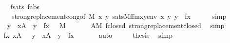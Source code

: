 \begin{isabellebody}
\ \ \ \ \isamarkupfalse%
\ fsats\ fabs\ \isanewline
\ \ \ \ \ \ strong{\isacharunderscore}{\kern0pt}replacement{\isacharunderscore}{\kern0pt}cong{\isacharbrackleft}{\kern0pt}of\ {\isachardoublequoteopen}{\isacharhash}{\kern0pt}{\isacharhash}{\kern0pt}M{\isachardoublequoteclose}\ {\isachardoublequoteopen}{\isasymlambda}x\ y{\isachardot}{\kern0pt}\ sats{\isacharparenleft}{\kern0pt}M{\isacharcomma}{\kern0pt}f{\isacharunderscore}{\kern0pt}fm{\isacharcomma}{\kern0pt}{\isacharbrackleft}{\kern0pt}x{\isacharcomma}{\kern0pt}y{\isacharbrackright}{\kern0pt}{\isacharat}{\kern0pt}env{\isacharparenright}{\kern0pt}{\isachardoublequoteclose}\ {\isachardoublequoteopen}{\isasymlambda}x\ y{\isachardot}{\kern0pt}\ y\ {\isacharequal}{\kern0pt}\ f{\isacharparenleft}{\kern0pt}x{\isacharparenright}{\kern0pt}{\isachardoublequoteclose}{\isacharbrackright}{\kern0pt}\isanewline
\ \ \ \ \isamarkupfalse%
\ simp\isanewline
\ \ \isamarkupfalse%
\isanewline
\ \ \isamarkupfalse%
\ {\isachardoublequoteopen}{\isacharbraceleft}{\kern0pt}\ y\ {\isachardot}{\kern0pt}\ x{\isasymin}A\ {\isacharcomma}{\kern0pt}\ y\ {\isacharequal}{\kern0pt}\ f{\isacharparenleft}{\kern0pt}x{\isacharparenright}{\kern0pt}\ {\isacharbraceright}{\kern0pt}\ {\isasymin}\ M{\isachardoublequoteclose}\ \isanewline
\ \ \ \ \isamarkupfalse%
\ {\isacartoucheopen}A{\isasymin}M{\isacartoucheclose}\ fclosed\ strong{\isacharunderscore}{\kern0pt}replacement{\isacharunderscore}{\kern0pt}closed\ \isamarkupfalse%
\ simp\isanewline
\ \ \isamarkupfalse%
\isanewline
\ \ \isamarkupfalse%
\ {\isachardoublequoteopen}{\isacharbraceleft}{\kern0pt}f{\isacharparenleft}{\kern0pt}x{\isacharparenright}{\kern0pt}{\isachardot}{\kern0pt}\ x{\isasymin}A{\isacharbraceright}{\kern0pt}\ {\isacharequal}{\kern0pt}\ {\isacharbraceleft}{\kern0pt}\ y\ {\isachardot}{\kern0pt}\ x{\isasymin}A\ {\isacharcomma}{\kern0pt}\ y\ {\isacharequal}{\kern0pt}\ f{\isacharparenleft}{\kern0pt}x{\isacharparenright}{\kern0pt}\ {\isacharbraceright}{\kern0pt}{\isachardoublequoteclose}\isanewline
\ \ \ \ \isamarkupfalse%
\ auto\isanewline
\ \ \isamarkupfalse%
\ \isamarkupfalse%
\ {\isacharquery}{\kern0pt}thesis\ \isamarkupfalse%
\ simp\isanewline
{}\isamarkupfalse%
%
\endisatagproof
{\isafoldproof}%
%
\isadelimproof
\isanewline
%
\endisadelimproof
\isanewline
{}\isamarkupfalse%
%
\isadelimdocument
%
\endisadelimdocument
%
\isatagdocument
%
\end{isabellebody}
